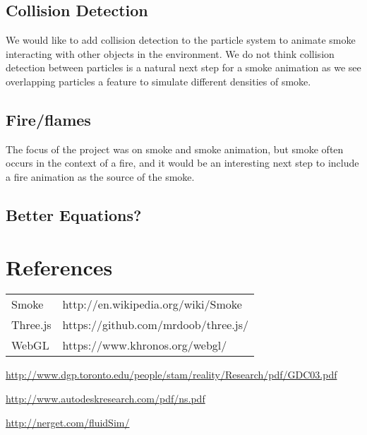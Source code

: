 \documentclass[conference]{acmsiggraph}
\begin{document}
\subsection{Collision Detection}

We would like to add collision detection to the particle system to animate smoke
interacting with other objects in the environment. We do not think collision
detection between particles is a natural next step for a smoke animation as we
see overlapping particles a feature to simulate different densities of smoke.

\subsection{Fire/flames}

The focus of the project was on smoke and smoke animation, but smoke often
occurs in the context of a fire, and it would be an interesting next step to
include a fire animation as the source of the smoke.

\subsection{Better Equations?}

\section{References}

\begin{tabular}{l l}
  Smoke    & http://en.wikipedia.org/wiki/Smoke   \\
  Three.js & https://github.com/mrdoob/three.js/  \\
  WebGL    & https://www.khronos.org/webgl/       \\
\end{tabular}

\url{http://www.dgp.toronto.edu/people/stam/reality/Research/pdf/GDC03.pdf}

\url{http://www.autodeskresearch.com/pdf/ns.pdf}

\url{http://nerget.com/fluidSim/}




\end{document}
